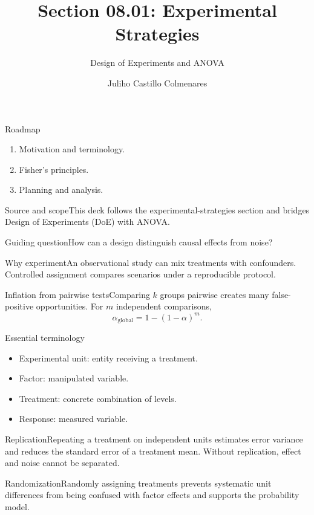\documentclass[10pt,aspectratio=169]{beamer}
\title[Experimental strategies]{Section 08.01: Experimental Strategies}\subtitle{Design of Experiments and ANOVA}
\author[J. Castillo Colmenares]{Juliho Castillo Colmenares}\institute{Tecnológico de Monterrey}\date{}
\begin{document}
\begin{frame}[plain]\titlepage\end{frame}
\begin{frame}{Roadmap}\small\begin{enumerate}\item Motivation and terminology.\item Fisher's principles.\item Planning and analysis.\end{enumerate}\end{frame}
\begin{frame}{Source and scope}\small This deck follows the experimental-strategies section and bridges Design of Experiments (DoE) with ANOVA.\begin{block}{Guiding question}How can a design distinguish causal effects from noise?\end{block}\end{frame}
\begin{frame}{Why experiment}\small An observational study can mix treatments with confounders. Controlled assignment compares scenarios under a reproducible protocol.\end{frame}
\begin{frame}{Inflation from pairwise tests}\small Comparing $k$ groups pairwise creates many false-positive opportunities. For $m$ independent comparisons,\[\alpha_{\mathrm{global}}=1-(1-\alpha)^m.\]\end{frame}
\begin{frame}{Essential terminology}\small\begin{itemize}\item Experimental unit: entity receiving a treatment.\item Factor: manipulated variable.\item Treatment: concrete combination of levels.\item Response: measured variable.\end{itemize}\end{frame}
\begin{frame}{Replication}\small Repeating a treatment on independent units estimates error variance and reduces the standard error of a treatment mean. Without replication, effect and noise cannot be separated.\end{frame}
\begin{frame}{Randomization}\small Randomly assigning treatments prevents systematic unit differences from being confused with factor effects and supports the probability model.\end{frame}
\end{document}

